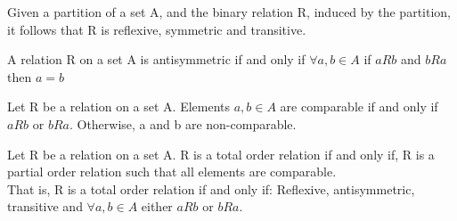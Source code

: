 \begin{theorm}
    Given a partition of a set A, and the binary relation R, induced by the partition, it follows that R is reflexive, symmetric and transitive.
\end{theorm}
\begin{definition}
    A relation R on a set A is antisymmetric if and only if \(\forall a, b \in A\) if \(aRb\) and \(bRa\) then \(a=b\)
\end{definition}
\begin{definition}
    Let R be a relation on a set A. Elements \(a, b\in A\) are comparable if and only if \(aRb\) or \(bRa\). Otherwise, a and b are non-comparable.
\end{definition}
\begin{definition}
    Let R be a relation on a set A. R is a total order relation if and only if, R is a partial order relation such that all elements are comparable.\\
    That is, R is a total order relation if and only if: Reflexive, antisymmetric, transitive and \(\forall a, b \in A\) either \(aRb\) or \(bRa\).
\end{definition}
